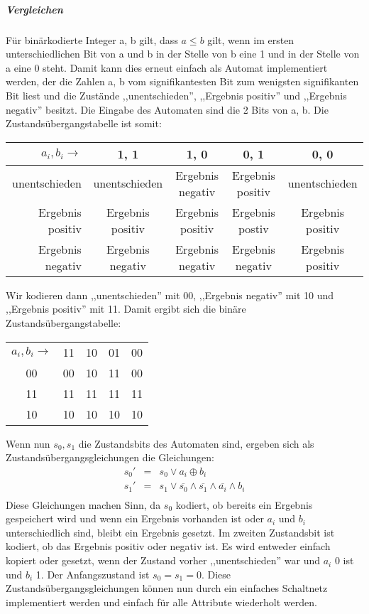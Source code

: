 \documentclass{article}
\begin{document}
\subparagraph{Vergleichen}
F\"ur bin\"arkodierte Integer a, b gilt, dass \(a \le b\) gilt,
wenn im ersten unterschiedlichen Bit von a und b in der Stelle von b eine 1 
und in der Stelle von a eine 0 steht. Damit kann dies erneut einfach als
Automat implementiert werden, der die Zahlen a, b vom signifikantesten
Bit zum wenigsten signifikanten Bit liest und die Zust\"ande 
,,unentschieden'', ,,Ergebnis positiv'' und ,,Ergebnis negativ'' besitzt.
Die Eingabe des Automaten sind die 2 Bits von a, b. Die Zustands\"ubergangstabelle
ist somit:
\begin{center}
\begin{tabular}{r|c c c c}
\(a_i, b_i \rightarrow \) & 1, 1 & 1, 0 & 0, 1 & 0, 0\\
\hline
unentschieden & unentschieden & Ergebnis negativ & Ergebnis positiv & unentschieden \\
Ergebnis positiv & Ergebnis positiv & Ergebnis positiv & Ergebnis postiv & Ergebnis positiv \\
Ergebnis negativ & Ergebnis negativ & Ergebnis negativ & Ergebnis negativ & Ergebnis positiv 
\end{tabular}
\end{center}

Wir kodieren dann ,,unentschieden'' mit 00, ,,Ergebnis negativ'' mit 10 und
,,Ergebnis positiv'' mit 11. Damit ergibt sich die bin\"are Zustands\"ubergangstabelle:\\
\begin{center}
\begin{tabular}{c|c c c c}
\(a_i, b_i \rightarrow\) & 11 & 10 & 01 & 00 \\
00 & 00 & 10 & 11 & 00 \\
11 & 11 & 11 & 11 & 11 \\
10 & 10 & 10 & 10 & 10 \\
\end{tabular}
\end{center}
Wenn nun \(s_0, s_1\) die Zustandsbits des Automaten sind, ergeben sich
als Zustands\"ubergangsgleichungen die Gleichungen:
\begin{align}
s_0' &=& s_0 \vee a_i \oplus b_i\\
s_1' &=& s_1 \vee \overline{s_0} \wedge \overline{s_1} \wedge \overline{a_i} \wedge b_i\\
\end{align}
Diese Gleichungen machen Sinn, da \(s_0\) kodiert, ob bereits
ein Ergebnis gespeichert wird und wenn ein Ergebnis vorhanden
ist oder \(a_i\) und \(b_i\) unterschiedlich sind, bleibt ein
Ergebnis gesetzt. Im zweiten Zustandsbit ist kodiert,
ob das Ergebnis positiv oder negativ ist. Es wird entweder einfach
kopiert oder gesetzt, wenn der Zustand vorher ,,unentschieden'' war
und \(a_i\) 0 ist und \(b_i\) 1. Der Anfangszustand ist \(s_0 = s_1 = 0\).
Diese Zustands\"ubergangsgleichungen k\"onnen nun durch ein
einfaches Schaltnetz implementiert werden und einfach f\"ur alle
Attribute wiederholt werden.
\end{document}

